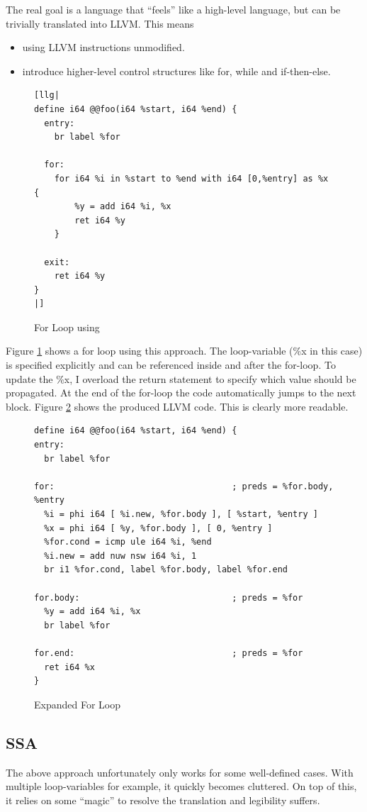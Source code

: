 \documentclass[a4paper,bibliography=totocnumbered,parskip,headsepline]{scrbook}
\begin{document}
The real goal is a language that ``feels'' like a high-level language, but can be trivially translated into LLVM.
This means
\begin{itemize}
 \item using LLVM instructions unmodified.
 \item introduce higher-level control structures like for, while and if-then-else.
\end{itemize}

\begin{figure}
\begin{lstlisting}
[llg|
define i64 @@foo(i64 %start, i64 %end) {
  entry:
    br label %for

  for:
    for i64 %i in %start to %end with i64 [0,%entry] as %x {
        %y = add i64 %i, %x
        ret i64 %y
    }

  exit:
    ret i64 %y
}
|]
\end{lstlisting}
\caption{For Loop using }
\label{fig:forquote}
\end{figure}

Figure \ref{fig:forquote} shows a for loop using this approach.
The loop-variable (\%x in this case) is specified explicitly and can be referenced inside and after the for-loop.
To update the \%x, I overload the return statement to specify which value should be propagated.
At the end of the for-loop the code automatically jumps to the next block.
Figure \ref{fig:forquote1} shows the produced LLVM code.
This is clearly more readable.

\begin{figure}
\begin{lstlisting}
define i64 @@foo(i64 %start, i64 %end) {
entry:
  br label %for

for:                                   ; preds = %for.body, %entry
  %i = phi i64 [ %i.new, %for.body ], [ %start, %entry ]
  %x = phi i64 [ %y, %for.body ], [ 0, %entry ]
  %for.cond = icmp ule i64 %i, %end
  %i.new = add nuw nsw i64 %i, 1
  br i1 %for.cond, label %for.body, label %for.end

for.body:                              ; preds = %for
  %y = add i64 %i, %x
  br label %for

for.end:                               ; preds = %for
  ret i64 %x
}
\end{lstlisting}
\caption{Expanded For Loop}
\label{fig:forquote1}
\end{figure}

\subsection{SSA}
The above approach unfortunately only works for some well-defined cases.
With multiple loop-variables for example, it quickly becomes cluttered.
On top of this, it relies on some ``magic'' to resolve the translation and legibility suffers.
\end{document}
